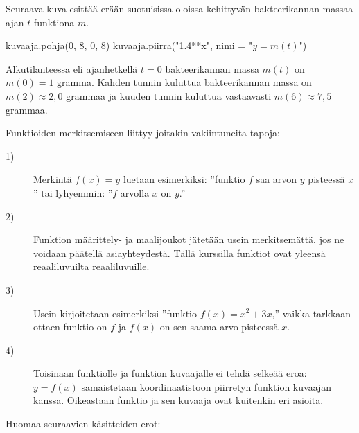 \begin{esimerkki}
Seuraava kuva esittää erään suotuisissa oloissa kehittyvän bakteerikannan massaa ajan \(t\) funktiona $m$.

\begin{kuva}
    kuvaaja.pohja(0, 8, 0, 8)
    kuvaaja.piirra("1.4**x", nimi = "$y=m(t)$")
\end{kuva}

Alkutilanteessa eli ajanhetkellä \(t=0\) bakteerikannan massa \(m(t)\) on \(m(0)=1\) gramma. Kahden tunnin kuluttua bakteerikannan massa on \(m(2)\approx 2,0\) grammaa ja kuuden tunnin kuluttua vastaavasti \(m(6)\approx 7,5\) grammaa. 
\end{esimerkki}

Funktioiden merkitsemiseen liittyy joitakin vakiintuneita tapoja:
\begin{description}
	\item[1)] Merkintä $f(x) = y$ luetaan esimerkiksi: ''funktio \(f\) saa arvon $y$ pisteessä $x$'' tai lyhyemmin: ''\(f\) arvolla \(x\) on \(y\).''
	\item[2)] Funktion määrittely- ja maalijoukot jätetään usein merkitsemättä, jos ne voidaan päätellä asiayhteydestä.
		Tällä kurssilla funktiot ovat yleensä reaaliluvuilta reaaliluvuille.
	\item[3)] Usein kirjoitetaan esimerkiksi ''funktio $f(x) = x^2+3x$,'' vaikka tarkkaan ottaen funktio on $f$ ja
		$f(x)$ on sen saama arvo pisteessä $x$.
	\item[4)] Toisinaan funktiolle ja funktion kuvaajalle ei tehdä selkeää eroa:
		$y = f(x)$ samaistetaan koordinaatistoon piirretyn funktion kuvaajan kanssa.
		Oikeastaan funktio ja sen kuvaaja ovat kuitenkin eri asioita.
\end{description}

Huomaa seuraavien käsitteiden erot:

